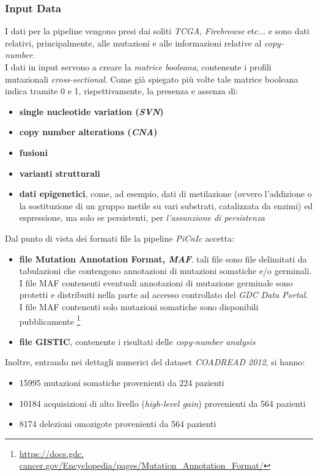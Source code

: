 \documentclass[a4paper,12pt, oneside]{book}
\begin{document}
\subsubsection{Input Data}
I dati per la pipeline vengono presi dai soliti \textit{TCGA},
\textit{Firebrowse} etc$\ldots$ e sono dati relativi, principalmente, alle
mutazioni e alle informazioni relative al \textit{copy-number}.\\
I dati in input servono a creare la \textit{matrice booleana}, contenente i
profili mutazionali \textit{cross-sectional}. Come già spiegato più volte tale
matrice booleana indica tramite 0 e 1, rispettivamente, la presenza e assenza
di:
\begin{itemize}
  \item \textbf{single nucleotide variation (\textit{SVN})}
  \item \textbf{copy number alterations (\textit{CNA})}
  \item \textbf{fusioni}
  \item \textbf{varianti strutturali}
  \item \textbf{dati epigenetici}, come, ad esempio, dati di metilazione
  (ovvero l'addizione o la sostituzione di un gruppo metile su vari substrati,
  catalizzata da enzimi) ed espressione, ma solo se persistenti, per
  \textit{l'assunzione di persistenza}
\end{itemize}
Dal punto di vista dei formati file la pipeline \textit{PiCnIc} accetta:
\begin{itemize}
  \item \textbf{file Mutation Annotation Format, \textit{MAF}}. tali file sono
  file delimitati da tabulazioni che contengono annotazioni di mutazioni
  somatiche e/o germinali. I file MAF contenenti eventuali annotazioni di
  mutazione germinale sono protetti e distribuiti nella parte ad accesso
  controllato del \textit{GDC Data Portal}. I file MAF contenenti solo mutazioni
  somatiche sono disponibili pubblicamente \footnote{\url{https://docs.gdc.
      cancer.gov/Encyclopedia/pages/Mutation_Annotation_Format/}} 
  \item \textbf{file GISTIC}, contenente i risultati delle \textit{copy-number
    analysis} 
\end{itemize}
Inoltre, entrando nei dettagli numerici del dataset \textit{COADREAD
  2012}, si hanno:
\begin{itemize}
  \item 15995 mutazioni somatiche provenienti da 224 pazienti
  \item 10184 acquisizioni di alto livello (\textit{high-level gain})
  provenienti da 564 pazienti 
  \item 8174 delezioni omozigote provenienti da 564 pazienti
\end{itemize}
\end{document}
